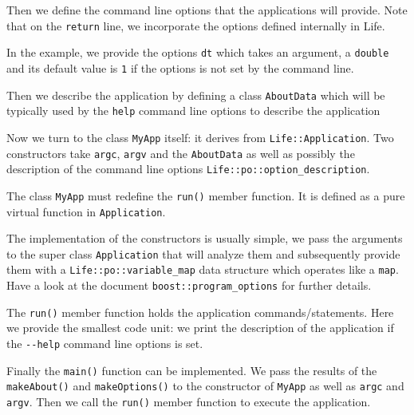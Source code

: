 \documentclass[11pt]{article}
\begin{document}


Then we define the command line options that the applications will
provide. Note that on the \lstinline!return! line, we incorporate the
options defined internally in Life.



In the example, we provide the options \lstinline!dt! which takes an
argument, a \lstinline!double! and its default value is \lstinline!1!
if the options is not set by the command line.

Then we describe the application by defining a class
\lstinline!AboutData! which will be typically used by the
\lstinline!help! command line options to describe the application





Now we turn to the class \lstinline!MyApp! itself: it derives from
\lstinline!Life::Application!. Two constructors take \lstinline!argc!,
\lstinline!argv! and the \lstinline!AboutData! as well as possibly the
description of the command line options \lstinline!Life::po::option_description!.

The class \lstinline!MyApp! must redefine the \lstinline!run()! member
function. It is defined as a pure virtual function in
\lstinline!Application!.




The implementation of the constructors is usually simple, we pass the
arguments to the super class \lstinline!Application! that will analyze
them and subsequently provide them with a
\lstinline!Life::po::variable_map! data structure which operates like
a \lstinline!map!. Have a look at the document
\lstinline!boost::program_options! for further details.



The \lstinline!run()! member function holds the application
commands/statements. Here we provide the smallest code unit: we print
the description of the application if the \lstinline!--help! command
line options is set.


Finally the \lstinline!main()! function can be implemented. We pass
the results of the \lstinline!makeAbout()! and
\lstinline!makeOptions()! to the constructor of \lstinline!MyApp! as
well as \lstinline!argc! and \lstinline!argv!. Then we call the
\lstinline!run()! member function to execute the application.
\end{document}
